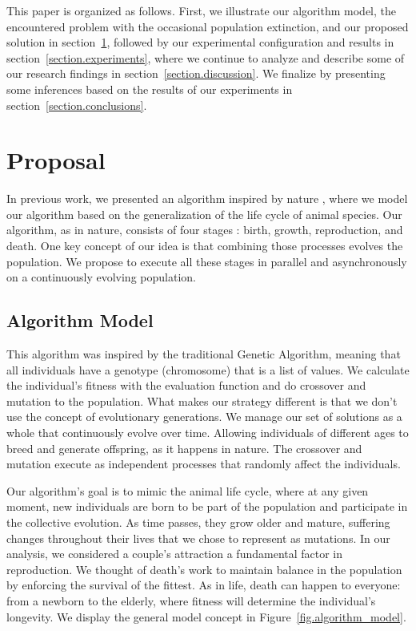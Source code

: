 \documentclass[graybox]{svmult}
\begin{document}
    This paper is organized as follows. First, we 
    illustrate our algorithm model, the encountered problem with the occasional
    population extinction, and our proposed solution in
    section~\ref{section.proposal}, followed by our experimental configuration and
    results in section~\ref{section.experiments}, where we continue to analyze and
    describe some of our research findings in section~\ref{section.discussion}. We
    finalize by presenting some inferences based on the results of our experiments
    in section~\ref{section.conclusions}.

\section{Proposal}
    \label{section.proposal}

    In previous work, we presented an algorithm inspired by nature 
    \cite{Felix-Saul2022}, where we model our algorithm based on
    the generalization of the life cycle of animal species. Our algorithm, as
    in nature, consists of four stages \cite{read1968system}: birth, growth,
    reproduction, and death. One key concept of our idea is that combining
    those processes evolves the population. We propose to execute all these
    stages in parallel and asynchronously on a continuously evolving
    population.


    \subsection{Algorithm Model}
        
        This algorithm was inspired by the traditional Genetic Algorithm,
        meaning that all individuals have a genotype (chromosome) that is a
        list of values. We calculate the individual's fitness with the
        evaluation function and do crossover and mutation to the population.
        What makes our strategy different is that we don't use the concept of
        evolutionary generations. We manage our set of solutions as a whole
        that continuously evolve over time. Allowing individuals of different
        ages to breed and generate offspring, as it happens in nature. The
        crossover and mutation execute as independent processes that randomly
        affect the individuals.

        Our algorithm's goal is to mimic the animal life cycle, where at any
        given moment, new individuals are born to be part of the population and
        participate in the collective evolution. As time passes, they grow
        older and mature, suffering changes throughout their lives that we
        chose to represent as mutations. In our analysis, we considered a
        couple's attraction a fundamental factor in reproduction. We thought of
        death's work to maintain balance in the population by enforcing the
        survival of the fittest. As in life, death can happen to everyone: from
        a newborn to the elderly, where fitness will determine the individual's
        longevity. We display the general model concept in
        Figure~\ref{fig.algorithm_model}.
\end{document}

